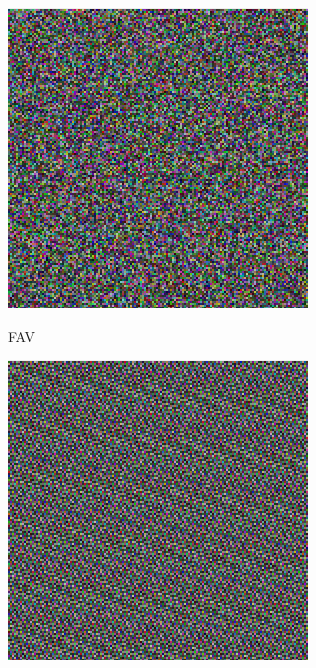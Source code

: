 \documentclass[
    parspace,
    noindent,
    nohyp,
]{elteiktdk}[2023/04/10]
\begin{document}
\begin{figure}[H]
  \centering
  \begin{minipage}[b]{0.23\textwidth}
    \centering
    \includegraphics[width=\textwidth]{image/permutation-fav.png}
    \par FAV
  \end{minipage}
  \hspace*{\fill}
  \begin{minipage}[b]{0.23\textwidth}
    \centering
    \includegraphics[width=\textwidth]{image/permutation-mp1.png}

\end{minipage}
\end{figure}
\end{document}
